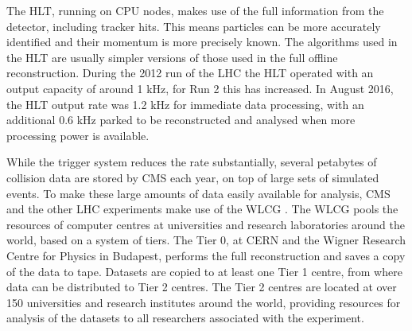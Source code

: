 
The \ac{HLT}, running on CPU nodes, makes use of the full information
from the detector, including tracker hits. This means particles
can be more accurately identified and their momentum is more
precisely known. The algorithms used in the \ac{HLT} are usually simpler
versions of those used in the full offline reconstruction. %
During the 2012 run of the \ac{LHC} the \ac{HLT} operated with an output
capacity of around 1 kHz, for Run 2 this has increased. In August 2016, 
the \ac{HLT} output rate was 1.2 kHz for immediate data processing, with
an additional 0.6 kHz parked to be reconstructed and analysed when 
more processing power is available\cite{CMS-PAS-HIG-16-037}. %

While the trigger system reduces the rate substantially, several
petabytes of collision data are stored by \ac{CMS} each year, on top
of large sets of simulated events. 
To make these large amounts of data easily available for analysis, 
\ac{CMS} and the other \ac{LHC} experiments make use of the \ac{WLCG} \cite{lhc-wlcg}. 
The \ac{WLCG} pools the resources of computer centres at universities and research
laboratories around the world, based on a system of tiers. The Tier 0, at \ac{CERN} and
the Wigner Research Centre for Physics in Budapest, performs the full reconstruction
and saves a copy of the data to tape. Datasets are copied to at least one Tier 1 centre, from
where data can be distributed to Tier 2 centres. The Tier 2 centres are located
at over 150 universities and research institutes around the world, providing 
resources for analysis of the datasets to all researchers associated with the experiment.




